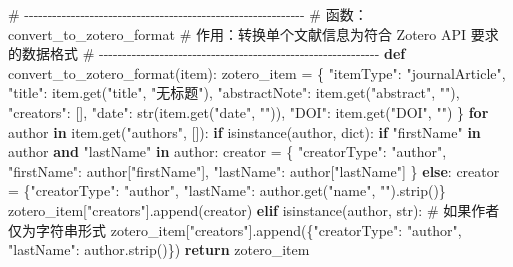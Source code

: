 \documentclass[
  letterpaper,
  DIV=11,
  numbers=noendperiod]{scrreprt}
\newenvironment{Shaded}{\begin{snugshade}}{\end{snugshade}}
\newcommand{\BuiltInTok}[1]{\textcolor[rgb]{0.00,0.23,0.31}{#1}}
\newcommand{\CommentTok}[1]{\textcolor[rgb]{0.37,0.37,0.37}{#1}}
\newcommand{\ControlFlowTok}[1]{\textcolor[rgb]{0.00,0.23,0.31}{\textbf{#1}}}
\newcommand{\KeywordTok}[1]{\textcolor[rgb]{0.00,0.23,0.31}{\textbf{#1}}}
\newcommand{\NormalTok}[1]{\textcolor[rgb]{0.00,0.23,0.31}{#1}}
\newcommand{\OperatorTok}[1]{\textcolor[rgb]{0.37,0.37,0.37}{#1}}
\newcommand{\StringTok}[1]{\textcolor[rgb]{0.13,0.47,0.30}{#1}}
\begin{document}
\begin{Shaded}
\begin{Highlighting}[]
\CommentTok{\# {-}{-}{-}{-}{-}{-}{-}{-}{-}{-}{-}{-}{-}{-}{-}{-}{-}{-}{-}{-}{-}{-}{-}{-}{-}{-}{-}{-}{-}{-}{-}{-}{-}{-}{-}{-}{-}{-}{-}{-}{-}{-}{-}{-}{-}{-}{-}{-}{-}{-}{-}{-}{-}{-}{-}{-}{-}{-}{-}{-}}
\CommentTok{\# 函数：convert\_to\_zotero\_format}
\CommentTok{\# 作用：转换单个文献信息为符合 Zotero API 要求的数据格式}
\CommentTok{\# {-}{-}{-}{-}{-}{-}{-}{-}{-}{-}{-}{-}{-}{-}{-}{-}{-}{-}{-}{-}{-}{-}{-}{-}{-}{-}{-}{-}{-}{-}{-}{-}{-}{-}{-}{-}{-}{-}{-}{-}{-}{-}{-}{-}{-}{-}{-}{-}{-}{-}{-}{-}{-}{-}{-}{-}{-}{-}{-}{-}}
\KeywordTok{def}\NormalTok{ convert\_to\_zotero\_format(item):}
\NormalTok{    zotero\_item }\OperatorTok{=}\NormalTok{ \{}
        \StringTok{"itemType"}\NormalTok{: }\StringTok{"journalArticle"}\NormalTok{,}
        \StringTok{"title"}\NormalTok{: item.get(}\StringTok{"title"}\NormalTok{, }\StringTok{"无标题"}\NormalTok{),}
        \StringTok{"abstractNote"}\NormalTok{: item.get(}\StringTok{"abstract"}\NormalTok{, }\StringTok{""}\NormalTok{),}
        \StringTok{"creators"}\NormalTok{: [],}
        \StringTok{"date"}\NormalTok{: }\BuiltInTok{str}\NormalTok{(item.get(}\StringTok{"date"}\NormalTok{, }\StringTok{""}\NormalTok{)),}
        \StringTok{"DOI"}\NormalTok{: item.get(}\StringTok{"DOI"}\NormalTok{, }\StringTok{""}\NormalTok{)}
\NormalTok{    \}}
    \ControlFlowTok{for}\NormalTok{ author }\KeywordTok{in}\NormalTok{ item.get(}\StringTok{"authors"}\NormalTok{, []):}
        \ControlFlowTok{if} \BuiltInTok{isinstance}\NormalTok{(author, }\BuiltInTok{dict}\NormalTok{):}
            \ControlFlowTok{if} \StringTok{"firstName"} \KeywordTok{in}\NormalTok{ author }\KeywordTok{and} \StringTok{"lastName"} \KeywordTok{in}\NormalTok{ author:}
\NormalTok{                creator }\OperatorTok{=}\NormalTok{ \{}
                    \StringTok{"creatorType"}\NormalTok{: }\StringTok{"author"}\NormalTok{,}
                    \StringTok{"firstName"}\NormalTok{: author[}\StringTok{"firstName"}\NormalTok{],}
                    \StringTok{"lastName"}\NormalTok{: author[}\StringTok{"lastName"}\NormalTok{]}
\NormalTok{                \}}
            \ControlFlowTok{else}\NormalTok{:}
\NormalTok{                creator }\OperatorTok{=}\NormalTok{ \{}\StringTok{"creatorType"}\NormalTok{: }\StringTok{"author"}\NormalTok{, }\StringTok{"lastName"}\NormalTok{: author.get(}\StringTok{"name"}\NormalTok{, }\StringTok{""}\NormalTok{).strip()\}}
\NormalTok{            zotero\_item[}\StringTok{"creators"}\NormalTok{].append(creator)}
        \ControlFlowTok{elif} \BuiltInTok{isinstance}\NormalTok{(author, }\BuiltInTok{str}\NormalTok{):}
            \CommentTok{\# 如果作者仅为字符串形式}
\NormalTok{            zotero\_item[}\StringTok{"creators"}\NormalTok{].append(\{}\StringTok{"creatorType"}\NormalTok{: }\StringTok{"author"}\NormalTok{, }\StringTok{"lastName"}\NormalTok{: author.strip()\})}
    \ControlFlowTok{return}\NormalTok{ zotero\_item}


\end{Highlighting}
\end{Shaded}
\end{document}
